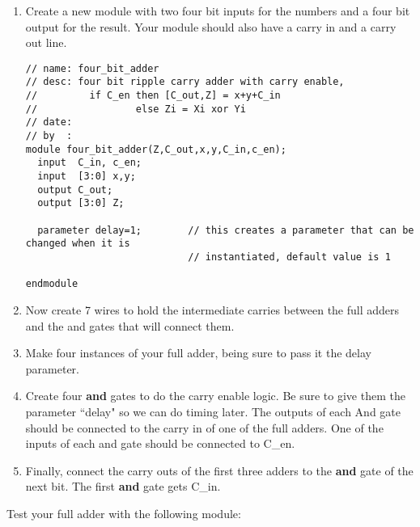 \begin{enumerate}
\item Create a new module with two four bit inputs for the numbers and a four bit output for the result.  Your module should also have a carry in and a carry out line.

\begin{verbatim}
// name: four_bit_adder
// desc: four bit ripple carry adder with carry enable,
//         if C_en then [C_out,Z] = x+y+C_in
//                 else Zi = Xi xor Yi
// date:
// by  :
module four_bit_adder(Z,C_out,x,y,C_in,c_en);
  input  C_in, c_en;
  input  [3:0] x,y;
  output C_out;
  output [3:0] Z;

  parameter delay=1;        // this creates a parameter that can be changed when it is
                            // instantiated, default value is 1

endmodule
\end{verbatim}


\item Now create 7 wires to hold the intermediate carries between the full adders and the and gates that will connect them.

\item Make four instances of your full adder, being sure to pass it the delay parameter.

\item Create four \textbf{and} gates to do the carry enable logic.  Be sure to give them the parameter ``delay" so we can do timing later.  The outputs of each And gate should be connected to the carry in of one of the full adders.  One of the inputs of each and gate should be connected to C\_en.

\item Finally, connect the carry outs of the first three adders to the \textbf{and} gate of the next bit.  The first \textbf{and} gate gets C\_in.

\end{enumerate}

Test your full adder with the following module:

